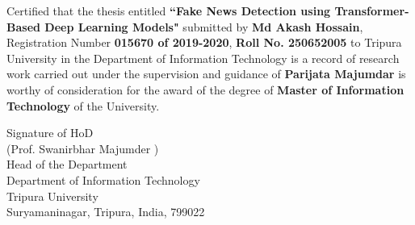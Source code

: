 \noindent Certified that the thesis entitled {\bf ``Fake News Detection using Transformer-Based Deep Learning Models"} submitted by {\bf Md Akash Hossain}, Registration Number {\bf 015670 of 2019-2020}, {\bf Roll No. 250652005} to Tripura University in the Department of Information Technology is a record of research work carried out under the supervision and guidance of {\bf Parijata Majumdar} is worthy of consideration for the award of the degree of {\bf Master of Information Technology} of the University.



\vspace{.7 in}
\begin{flushright}
Signature of HoD\\ 
(Prof. Swanirbhar Majumder )\\
Head of the Department\\
Department of Information Technology\\
Tripura University\\
Suryamaninagar, Tripura, India, 799022 
\end{flushright}